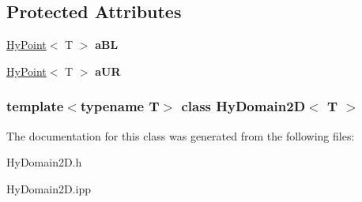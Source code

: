 \subsection*{Protected Attributes}
\begin{DoxyCompactItemize}
\item 
\hypertarget{classHyDomain2D_ac1fa1a219d310f136b018de83017cd83}{
\hyperlink{classHyPoint}{HyPoint}$<$ T $>$ {\bfseries aBL}}
\label{classHyDomain2D_ac1fa1a219d310f136b018de83017cd83}

\item 
\hypertarget{classHyDomain2D_a99208834a9d76e5916da06d2114ab09b}{
\hyperlink{classHyPoint}{HyPoint}$<$ T $>$ {\bfseries aUR}}
\label{classHyDomain2D_a99208834a9d76e5916da06d2114ab09b}

\end{DoxyCompactItemize}
\subsubsection*{template$<$typename T$>$ class HyDomain2D$<$ T $>$}



The documentation for this class was generated from the following files:\begin{DoxyCompactItemize}
\item 
HyDomain2D.h\item 
HyDomain2D.ipp\end{DoxyCompactItemize}
